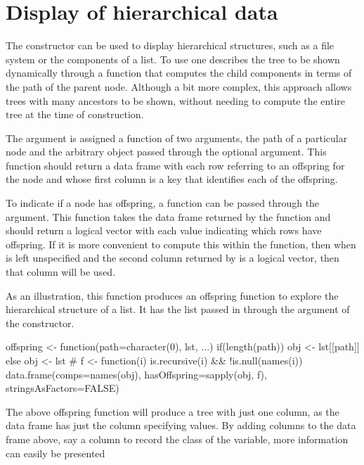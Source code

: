\section{Display of hierarchical data}
\label{sec:gWidgets-displ-heir-data}

The  constructor can be used to display
hierarchical structures, such as a file system or the components of a
list. To use  one describes the tree to be shown
dynamically through a function that computes the child components in
terms of the path of the parent node. Although a bit more complex,
this approach allows trees with many ancestors to be shown, without needing to
compute the entire tree at the time of construction.

The  argument is assigned a function of two
arguments, the path of a particular node and the arbitrary object
passed through the optional 
argument. This function should return a data frame with each row
referring to an offspring for the node and whose first column is a key
that identifies each of the offspring.

To indicate if a node has offspring, a function can be passed through
the  argument. This function takes the
data frame returned by the  function and should return
a logical vector with each value indicating which rows have
offspring. If it is more convenient to compute this within the
 function, then when  is left
unspecified and the second column returned by  is a
logical vector, then that column will be used.

As an illustration, this function produces an offspring function to
explore the hierarchical structure of a list. It has the list passed
in through the
 argument of the constructor.
\begin{Schunk}
\begin{Sinput}
 offspring <- function(path=character(0), lst, ...) {
   if(length(path))
     obj <- lst[[path]]
   else
       obj <- lst
   #
   f <- function(i) is.recursive(i) && !is.null(names(i))
   data.frame(comps=names(obj), 
              hasOffspring=sapply(obj, f),
              stringsAsFactors=FALSE)
 }
\end{Sinput}
\end{Schunk}
%
The above offspring function will produce a tree with just one column,
as the data frame has just the  column specifying
values. By adding columns to the data frame above, say a column to
record the class of the variable, more information can easily be
presented

